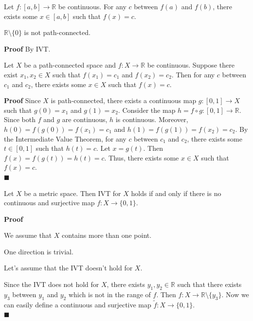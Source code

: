 \documentclass[main.tex]{subfiles}
\begin{document}
\begin{theorem}
     Let $f: [a,b] \rightarrow \mathbb{R}$ be continuous. For any $c$ between $f(a)$ and $f(b)$, there exists some $x \in [a,b]$ such that $f(x) = c$. 
\end{theorem}

\begin{example}
    $\mathbb{R}\setminus \{0\}$ is not path-connected. 
\end{example}
\par \noindent \textbf{Proof} By IVT. 

\begin{theorem}
     Let $X$ be a path-connected space and $f: X \rightarrow \mathbb{R}$ be continuous. Suppose there exist $x_1, x_2 \in X$ such that $f(x_1) = c_1$ and $f(x_2) = c_2$. Then for any $c$ between $c_1$ and $c_2$, there exists some $x \in X$ such that $f(x) = c$.
\end{theorem}
\par \noindent \textbf{Proof} Since $X$ is path-connected, there exists a continuous map $g: [0,1] \rightarrow X$ such that $g(0) = x_1$ and $g(1) = x_2$. Consider the map $h = f \circ g: [0,1] \rightarrow \mathbb{R}$. Since both $f$ and $g$ are continuous, $h$ is continuous. Moreover, $h(0) = f(g(0)) = f(x_1) = c_1$ and $h(1) = f(g(1)) = f(x_2) = c_2$. By the Intermediate Value Theorem, for any $c$ between $c_1$ and $c_2$, there exists some $t \in [0,1]$ such that $h(t) = c$. Let $x = g(t)$. Then $f(x) = f(g(t)) = h(t) = c$. Thus, there exists some $x \in X$ such that $f(x) = c$. 
\\ \null \hfill $\blacksquare$

\begin{property}
    Let $X$ be a metric space. Then IVT for $X$ holds if and only if there is no continuous and surjective map $f: X \rightarrow \{0, 1\}$. 
\end{property}
\par \noindent \textbf{Proof} 
\par We assume that $X$ contains more than one point. 
\par One direction is trivial. 
\par Let's assume that the IVT doesn't hold for $X$.
\par Since the IVT does not hold for $X$, there exists $y_1, y_2\in \mathbb{R}$ such that there exists $y_3$ between $y_1$ and $y_2$ which is not in the range of $f$. Then $f: X \rightarrow \mathbb{R}\setminus \{y_3\}$. Now we can easily define a continuous and surjective map $\tilde{f}: X \rightarrow \{0, 1\}$. 
\mbox{} \\ \null \hfill $\blacksquare$ 
\end{document}
